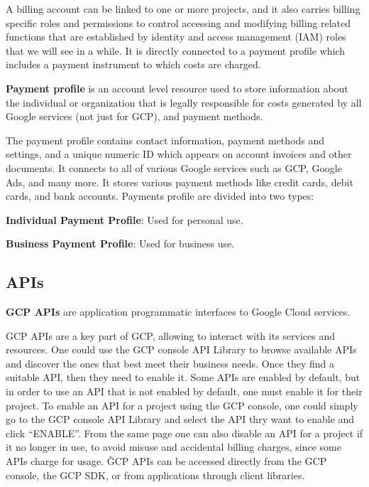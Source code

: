 A billing account can be linked to one or more projects, and it also carries billing specific roles and permissions to
control accessing and modifying billing related functions that are established by identity and access management (IAM)
roles that we will see in a while. It is directly connected to a payment profile which includes a payment instrument
to which costs are charged.

\textbf{Payment profile} is an account level resource used to store information about the individual or organization
that is legally responsible for costs generated by all Google services (not just for GCP), and payment methods.
\ed

The payment profile contains contact information, payment methods and settings, and a unique numeric ID which
appears on account invoices and other documents. It connects to all of various Google services such as GCP, Google
Ads, and many more. It stores various payment methods like credit cards, debit cards, and bank accounts. Payments
profile are divided into two types:
\bit
\item \textbf{Individual Payment Profile}: Used for personal use.
\item \textbf{Business Payment Profile}: Used for business use.
\eit

\subsection{APIs}

\textbf{GCP APIs} are application programmatic interfaces to Google Cloud services.
\ed

GCP APIs are a key part of GCP, allowing to interact with its services and resources. One could use the GCP console
API Library to browse available APIs and discover the ones that best meet their business needs. Once they find a
suitable API, then they need to enable it. Some APIs are enabled by default, but in order to use an API that is not
enabled by default, one must enable it for their project. To enable an API for a project using the GCP console, one
could simply go to the GCP console API Library and select the API thry want to enable and click ``ENABLE''. From the
same page one can also disable an API for a project if it no longer in use, to avoid misuse and accidental billing
charges, since some APIs charge for usage. \v

GCP APIs can be accessed directly from the GCP console, the GCP SDK, or from applications through client libraries.

